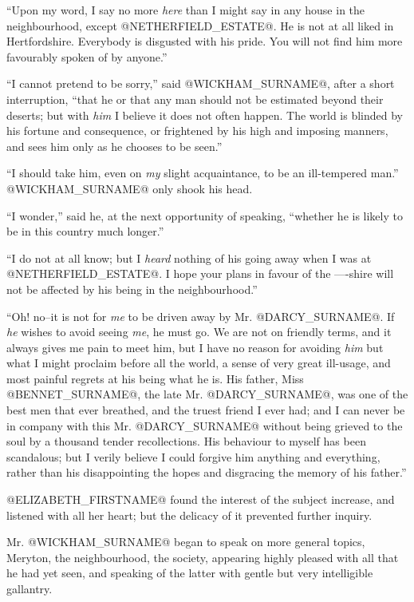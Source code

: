 ``Upon my word, I say no more \textit{here} than I might say in any house in
the neighbourhood, except @NETHERFIELD_ESTATE@. He is not at all liked in
Hertfordshire. Everybody is disgusted with his pride. You will not find
him more favourably spoken of by anyone.''

``I cannot pretend to be sorry,'' said @WICKHAM_SURNAME@, after a short
interruption, ``that he or that any man should not be estimated beyond
their deserts; but with \textit{him} I believe it does not often happen. The
world is blinded by his fortune and consequence, or frightened by his
high and imposing manners, and sees him only as he chooses to be seen.''

``I should take him, even on \textit{my} slight acquaintance, to be an
ill-tempered man.'' @WICKHAM_SURNAME@ only shook his head.

``I wonder,'' said he, at the next opportunity of speaking, ``whether he is
likely to be in this country much longer.''

``I do not at all know; but I \textit{heard} nothing of his going away when I
was at @NETHERFIELD_ESTATE@. I hope your plans in favour of the ----shire will
not be affected by his being in the neighbourhood.''

``Oh! no--it is not for \textit{me} to be driven away by Mr. @DARCY_SURNAME@. If \textit{he}
wishes to avoid seeing \textit{me}, he must go. We are not on friendly terms,
and it always gives me pain to meet him, but I have no reason for
avoiding \textit{him} but what I might proclaim before all the world, a sense
of very great ill-usage, and most painful regrets at his being what he
is. His father, Miss @BENNET_SURNAME@, the late Mr. @DARCY_SURNAME@, was one of the best men
that ever breathed, and the truest friend I ever had; and I can never
be in company with this Mr. @DARCY_SURNAME@ without being grieved to the soul by
a thousand tender recollections. His behaviour to myself has been
scandalous; but I verily believe I could forgive him anything and
everything, rather than his disappointing the hopes and disgracing the
memory of his father.''

@ELIZABETH_FIRSTNAME@ found the interest of the subject increase, and listened with
all her heart; but the delicacy of it prevented further inquiry.

Mr. @WICKHAM_SURNAME@ began to speak on more general topics, Meryton, the
neighbourhood, the society, appearing highly pleased with all that
he had yet seen, and speaking of the latter with gentle but very
intelligible gallantry.

